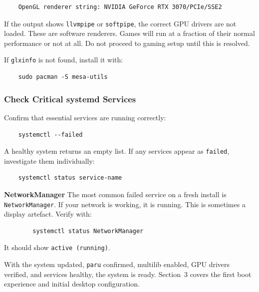\documentclass{article}
\newcommand{\code}[1]{\colorbox{codebg}{\texttt{#1}}}
\begin{document}
\begin{verbatim}
	OpenGL renderer string: NVIDIA GeForce RTX 3070/PCIe/SSE2
\end{verbatim}

\begin{tcolorbox}[arc=12pt, outer arc=10pt,
	colback=red!5!white, colframe=red!60!black,
	title=\textbf{Warning}]
	If the output shows \code{llvmpipe} or \code{softpipe}, the correct GPU drivers
	are not loaded. These are software renderers. Games will run at a fraction of
	their normal performance or not at all. Do not proceed to gaming setup until this
	is resolved.
\end{tcolorbox}

\noindent If \code{glxinfo} is not found, install it with:

\begin{verbatim}
	sudo pacman -S mesa-utils
\end{verbatim}

\subsubsection{Check Critical systemd Services}

Confirm that essential services are running correctly:

\begin{verbatim}
	systemctl --failed
\end{verbatim}

A healthy system returns an empty list. If any services appear as \code{failed},
investigate them individually:

\begin{verbatim}
	systemctl status service-name
\end{verbatim}

\begin{callout}{\textbf{NetworkManager}}
	The most common failed service on a fresh install is \code{NetworkManager}.
	If your network is working, it is running. This is sometimes a display artefact.
	Verify with:
	\begin{verbatim}
		systemctl status NetworkManager
	\end{verbatim}
	It should show \code{active (running)}.
\end{callout}

\noindent With the system updated, \code{paru} confirmed, multilib enabled, GPU
drivers verified, and services healthy, the system is ready. Section~3 covers
the first boot experience and initial desktop configuration.
\end{document}
